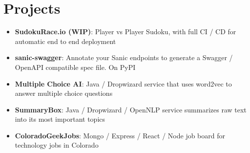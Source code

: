 \documentclass[letterpaper,11pt]{article}
\newcommand{\resumeItem}[2]{
  \item\small{
    \textbf{#1}{: #2 \vspace{-2pt}}
  }
}
\newcommand{\resumeSubItem}[2]{\resumeItem{#1}{#2}\vspace{-4pt}}
\newcommand{\resumeSubHeadingListStart}{\begin{itemize}[leftmargin=*]}
\newcommand{\resumeSubHeadingListEnd}{\end{itemize}}
\begin{document}
\section{Projects}
  \resumeSubHeadingListStart
    \resumeSubItem{SudokuRace.io (WIP)}
      {Player vs Player Sudoku, with full CI / CD for automatic end to end deployment}
    \resumeSubItem{sanic-swagger}
      {Annotate your Sanic endpoints to generate a Swagger / OpenAPI compatible
      spec file. On PyPI}
    \resumeSubItem{Multiple Choice AI}
      {Java / Dropwizard service that uses word2vec to answer
      multiple choice questions}
    \resumeSubItem{SummaryBox}
      {Java / Dropwizard / OpenNLP service summarizes raw text into its most
      important topics}
    \resumeSubItem{ColoradoGeekJobs}
      {Mongo / Express / React / Node job board for technology jobs in Colorado}
  \resumeSubHeadingListEnd
\end{document}
